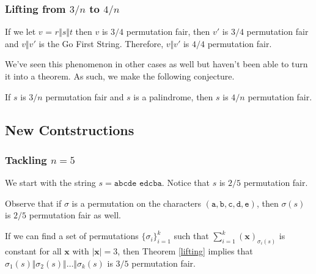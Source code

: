 \documentclass[aspectratio=169]{beamer}
\begin{document}
\begin{frame}[triangle=siiblue]
\frametitle{Lifting from $3/n$ to $4/n$}
If we let $v$ = $r \Vert s \Vert t$ then $v$ is $3/4$ permutation fair, then $v'$ is $3/4$ permutation fair and $v \Vert v'$ is the Go First String. Therefore, $v \Vert v'$ is $4/4$ permutation fair.

\vfill

We've seen this phenomenon in other cases as well but haven't been able to turn it into a theorem.  As such, we make the following conjecture.

\vfill

\begin{siiconjecture}[label=lift_34]{}{}
If $s$ is $3/n$ permutation fair and $s$ is a palindrome, then $s$ is $4/n$ permutation fair.
\end{siiconjecture}
\end{frame}

\subsection{New Contstructions}
\begin{frame}[triangle=siiblue]
\frametitle{Tackling $n=5$}
We start with the string $s = \texttt{abcde edcba}$. Notice that $s$ is $2/5$ permutation fair.

\vfill

Observe that if $\sigma$ is a permutation on the characters $(\texttt{a}, \texttt{b},\texttt{c},\texttt{d},\texttt{e})$, then $\sigma(s)$ is $2/5$ permutation fair as well.

\vfill

If we can find a set of permutations $\{\sigma_i\}_{i=1}^k$ such that $\sum_{i=1}^k (\mathbf{x})_{\sigma_i(s)}$ is constant for all $\mathbf{x}$ with $|\mathbf{x}| = 3$, then Theorem \ref{lifting} implies that $\sigma_1(s) \Vert \sigma_2(s) \Vert \ldots \Vert \sigma_k(s)$ is $3/5$ permutation fair. 
\end{frame}
\end{document}
